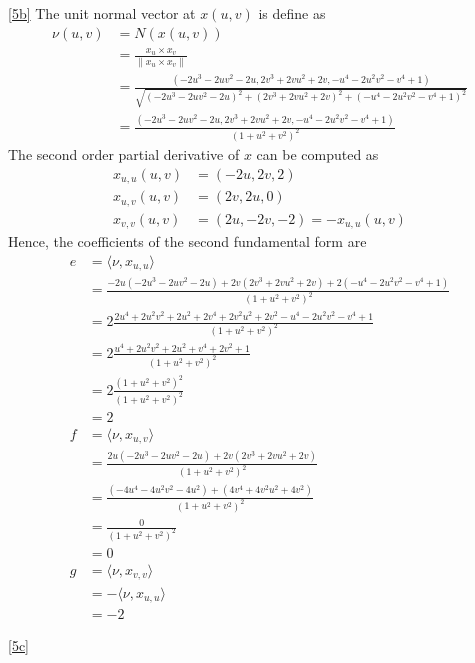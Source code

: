 \documentclass[a4paper]{report}
\begin{document}
\ref{5b} The unit normal vector at $x(u,v)$ is define as
\begin{align}
	\nu(u,v) &= N(x(u,v))\\
	&= \frac{x_u \times x_v}{\lVert x_u \times x_v \rVert}\\
	&= \frac{\left(-2u^3 - 2uv^2 - 2u, 2v^3 + 2vu^2 + 2v, - u^4 - 2u^2v^2 - v^4 + 1 \right)}{\sqrt{(-2u^3 - 2uv^2 - 2u)^2 + (2v^3 + 2vu^2 + 2v)^2 + (- u^4 - 2u^2v^2 - v^4 + 1)^2}}\\
	&= \frac{\left(-2u^3 - 2uv^2 - 2u, 2v^3 + 2vu^2 + 2v, - u^4 - 2u^2v^2 - v^4 + 1 \right)}{(1 + u^2 + v^2)^2}
\end{align}
The second order partial derivative of $x$ can be computed as
\begin{align}
	x_{u,u}(u,v) &= \left(-2u, 2v, 2 \right)\\
	x_{u,v}(u,v) &= \left(2v, 2u, 0 \right)\\
	x_{v,v}(u,v) &= \left(2u, -2v, -2 \right) = - x_{u,u}(u,v)
\end{align}
Hence, the coefficients of the second fundamental form are
\begin{align}
	e &= \langle \nu, x_{u,u} \rangle\\
	&= \frac{-2u(-2u^3 - 2uv^2 - 2u) + 2v(2v^3 + 2vu^2 + 2v) + 2(- u^4 - 2u^2v^2 - v^4 + 1)}{(1 + u^2 + v^2)^2}\\
	&= 2\frac{2u^4 + 2u^2v^2 + 2u^2 + 2v^4 + 2v^2u^2 + 2v^2 - u^4 - 2u^2v^2 - v^4 + 1}{(1 + u^2 + v^2)^2}\\
	&= 2\frac{u^4 + 2u^2v^2 + 2u^2 + v^4 + 2v^2 + 1}{(1 + u^2 + v^2)^2}\\
	&= 2\frac{(1 + u^2 + v^2)^2}{(1 + u^2 + v^2)^2}\\
	&= 2\\
	f &= \langle \nu, x_{u,v} \rangle \\
	&= \frac{2u(-2u^3 - 2uv^2 - 2u) + 2v(2v^3 + 2vu^2 + 2v)}{(1 + u^2 + v^2)^2}\\
	&=\frac{(-4u^4 - 4u^2v^2 - 4u^2) + (4v^4 + 4v^2u^2 + 4v^2)}{(1 + u^2 + v^2)^2}\\
	&=\frac{0}{(1 + u^2 + v^2)^2}\\
	&= 0 \\
	g &= \langle \nu, x_{v,v} \rangle \\
	&= -\langle \nu, x_{u,u} \rangle \\
	&= -2
\end{align}

\ref{5c}
\end{document}

